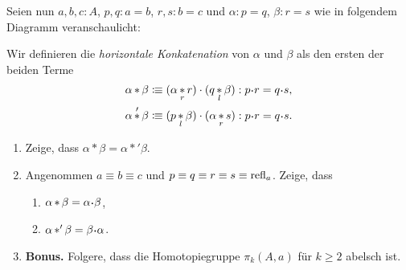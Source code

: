 \documentclass{uebung}
\DeclareMathOperator*{\whisk}{\ast}
\begin{document}
\begin{exercise}
  Seien nun $a,b,c:A$, $p,q:a=b$, $r,s:b=c$ und $\alpha:p=q$, $\beta:r=s$ wie in folgendem Diagramm veranschaulicht:
  \begin{center}
  \end{center}
  Wir definieren die \emph{horizontale Konkatenation} von $\alpha$ und $\beta$ als den ersten der beiden Terme
  \begin{align*}
    \alpha\whisk\beta &\colonequiv (\alpha \whisk_r r) \cdot (q \whisk_l \beta) : p\kon r = q\kon s,\\
    \alpha\whisk'\beta &\colonequiv (p \whisk_l \beta) \cdot (\alpha \whisk_r s) : p\kon r = q\kon s.
  \end{align*}
  \begin{enumerate}
    \item Zeige, dass $\alpha\whisk\beta = \alpha\whisk'\beta$.
    \item Angenommen $a\equiv b\equiv c$ und $p\equiv q\equiv r\equiv s\equiv \mathrm{refl}_a$.
      Zeige, dass
      \begin{enumerate}
        \item $\alpha\whisk\beta = \alpha\kon\beta$,
        \item $\alpha\whisk'\beta = \beta\kon\alpha$.
      \end{enumerate}
    \item \textbf{Bonus.} Folgere, dass die Homotopiegruppe $\pi_k(A,a)$ für $k\geq 2$ abelsch ist.
  \end{enumerate}
\end{exercise}
\end{document}
